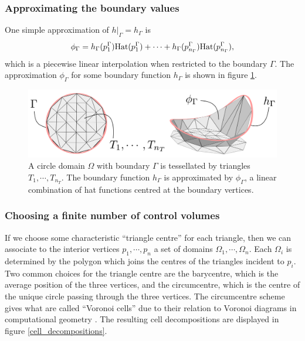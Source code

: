 \subsubsection{Approximating the boundary values}
One simple approximation of $\left.h\right|_\Gamma = h_\Gamma$ is
$$
    \phi_\Gamma = h_\Gamma(p^\Gamma_1)\text{Hat}(p^\Gamma_1)
                + \cdots
                + h_\Gamma(p^\Gamma_{n_\Gamma})\text{Hat}(p^\Gamma_{n_\Gamma}),
$$
which is a piecewise linear interpolation when restricted to the boundary $\Gamma$. The approximation $\phi_\Gamma$ for some boundary
function $h_\Gamma$ is shown in figure \ref{boundary}.
\begin{figure}[H]
    \begin{center}
        \includegraphics[width=0.9\linewidth]{figures/boundary/boundary.png}
    \end{center}
    \caption{\scriptsize
        A circle domain $\Omega$ with boundary $\Gamma$ is tessellated by triangles $T_1,\cdots,T_{n_T}$.
        The boundary function $h_\Gamma$ is approximated by $\phi_\Gamma$, a linear combination of hat functions centred at the boundary vertices.
    }
    \label{boundary}
\end{figure}

\subsubsection{Choosing a finite number of control volumes}
If we choose some characteristic ``triangle centre'' for each triangle, then we can associate to the interior vertices
$p_1,\cdots,p_n$ a set of domains $\Omega_1,\cdots,\Omega_n$. Each $\Omega_i$ is determined by the polygon which joins the centres of the triangles
incident to $p_i$.
Two common choices for the triangle centre are the barycentre, which is the average position of the three vertices, and the circumcentre,
which is the centre of the unique circle passing through the three vertices. The circumcentre scheme gives what are called
``Voronoi cells'' due to their relation to Voronoi diagrams in computational geometry \cite{orourke}.
The resulting cell decompositions are displayed in figure
\ref{cell_decompositions}.

